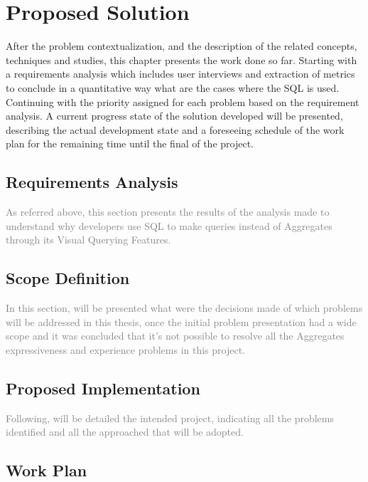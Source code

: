 \chapter{Proposed Solution}
\label{cha:proposed_solution}
After the problem contextualization, and the description of the related concepts, techniques and studies, this chapter presents the work done so far. Starting with a requirements analysis which includes user interviews and extraction of metrics to conclude in a quantitative way what are the cases where the SQL is used. Continuing with the priority assigned for each problem based on the requirement analysis. A current progress state of the solution developed will be presented, describing the actual development state and a foreseeing schedule of the work plan for the remaining time until the final of the project.

\section{Requirements Analysis}
\label{sec:requirements_analysis}
\textcolor{gray}{As referred above, this section presents the results of the analysis made to understand why developers use SQL to make queries instead of Aggregates through its Visual Querying Features.}

\section{Scope Definition}
\label{sec:scope_definition}
\textcolor{gray}{In this section, will be presented what were the decisions made of which problems will be addressed in this thesis, once the initial problem presentation had a wide scope and it was concluded that it's not possible to resolve all the Aggregates expressiveness and experience problems in this project.}

\section{Proposed Implementation}
\label{sec:proposed_implementation}
\textcolor{gray}{Following, will be detailed the intended project, indicating all the problems identified and all the approached that will be adopted.}

\section{Work Plan}
\label{sec:work_plan}

